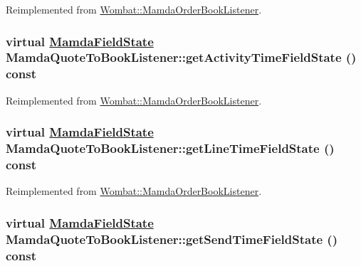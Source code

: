 Reimplemented from \hyperlink{classWombat_1_1MamdaOrderBookListener_cd480d3e1ecf4c3f2d726b907f4b34c3}{Wombat::Mamda\-Order\-Book\-Listener}.\hypertarget{classMamdaQuoteToBookListener_86342ed1f23500e6dbdbee055cb06886}{
\subsubsection[getActivityTimeFieldState]{\setlength{\rightskip}{0pt plus 5cm}virtual \hyperlink{namespaceWombat_93aac974f2ab713554fd12a1fa3b7d2a}{Mamda\-Field\-State} Mamda\-Quote\-To\-Book\-Listener::get\-Activity\-Time\-Field\-State () const}}
\label{classMamdaQuoteToBookListener_86342ed1f23500e6dbdbee055cb06886}




Reimplemented from \hyperlink{classWombat_1_1MamdaOrderBookListener_d1aa4977550c9b83e091509faa735d76}{Wombat::Mamda\-Order\-Book\-Listener}.\hypertarget{classMamdaQuoteToBookListener_72349a0b38fd3b0d53f80d29f09721c1}{
\subsubsection[getLineTimeFieldState]{\setlength{\rightskip}{0pt plus 5cm}virtual \hyperlink{namespaceWombat_93aac974f2ab713554fd12a1fa3b7d2a}{Mamda\-Field\-State} Mamda\-Quote\-To\-Book\-Listener::get\-Line\-Time\-Field\-State () const}}
\label{classMamdaQuoteToBookListener_72349a0b38fd3b0d53f80d29f09721c1}




Reimplemented from \hyperlink{classWombat_1_1MamdaOrderBookListener_967aa4033993bc70c16d95d26283da54}{Wombat::Mamda\-Order\-Book\-Listener}.\hypertarget{classMamdaQuoteToBookListener_3105e19fc56da0ddec1a79304a151a43}{
\subsubsection[getSendTimeFieldState]{\setlength{\rightskip}{0pt plus 5cm}virtual \hyperlink{namespaceWombat_93aac974f2ab713554fd12a1fa3b7d2a}{Mamda\-Field\-State} Mamda\-Quote\-To\-Book\-Listener::get\-Send\-Time\-Field\-State () const}}
\label{classMamdaQuoteToBookListener_3105e19fc56da0ddec1a79304a151a43}




